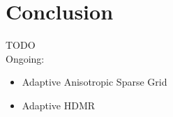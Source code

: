 \documentclass{mc2015}
\begin{document}
\section{Conclusion}
TODO\\Ongoing:
\begin{itemize}
\item Adaptive Anisotropic Sparse Grid
\item Adaptive HDMR
\end{itemize}
%
\end{document}
